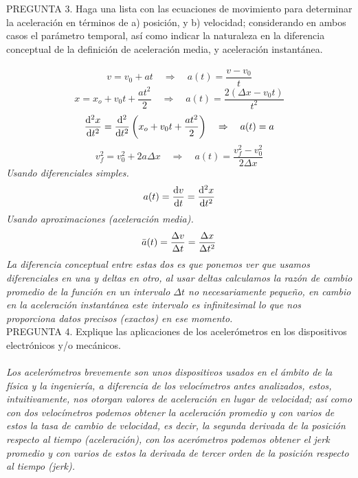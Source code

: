 \documentclass{article}
\begin{document}
PREGUNTA 3. Haga una lista con las ecuaciones de movimiento para determinar la aceleración en términos de a) posición, y b) velocidad; considerando en ambos casos el parámetro temporal, así como indicar la naturaleza en la diferencia conceptual de la definición de aceleración media, y aceleración instantánea. \\\\
\begin{equation}
v = v_0 + at \quad \Rightarrow \quad a(t) = \frac{v-v_0}{t}
\end{equation}{}
\begin{equation}
x = x_o + v_0t + \frac{at^2}{2} \quad \Rightarrow \quad a(t) = \frac{2(\Delta x - v_0t)}{t^2}
\end{equation}{}
\begin{equation}
\dv[2]{x}{t} = \dv[2]{}{t} \left(x_o + v_0t + \frac{at^2}{2}\right) \quad \Rightarrow \quad a(t) = a
\end{equation}{}
\begin{equation}
v_f^2 = v_0^2 + 2a\Delta x \quad \Rightarrow \quad a(t) = \frac{v_f^2 - v_0^2}{2\Delta x}
\end{equation}
\newpage
\noindent \textit{Usando diferenciales simples.}
\begin{equation}
a(t) = \dv{v}{t} = \dv[2]{x}{t}
\end{equation}
\textit{Usando aproximaciones (aceleración media).}
\begin{equation}
    \Bar{a}(t) = \frac{\Delta v}{\Delta t} = \frac{\Delta x}{\Delta t^2}
\end{equation}
\textit{La diferencia conceptual entre estas dos es que ponemos ver que usamos diferenciales en una y deltas en otro, al usar deltas calculamos la razón de cambio promedio de la función en un intervalo $\Delta t$ no necesariamente pequeño, en cambio en la aceleración instantánea este intervalo es infinitesimal lo que nos proporciona datos precisos (exactos) en ese momento.}\\


PREGUNTA 4. Explique las aplicaciones de los acelerómetros en los dispositivos electrónicos y/o mecánicos. \\\\
\textit{Los acelerómetros brevemente son unos dispositivos usados en el ámbito de la física y la ingeniería, a diferencia de los velocímetros antes analizados, estos, intuitivamente, nos otorgan valores de aceleración en lugar de velocidad; así como con dos velocímetros podemos obtener la aceleración promedio y con varios de estos la tasa de cambio de velocidad, es decir, la segunda derivada de la posición respecto al tiempo (aceleración), con los acerómetros podemos obtener el jerk promedio y con varios de estos la derivada de tercer orden de la posición respecto al tiempo (jerk).}\\
\end{document}
